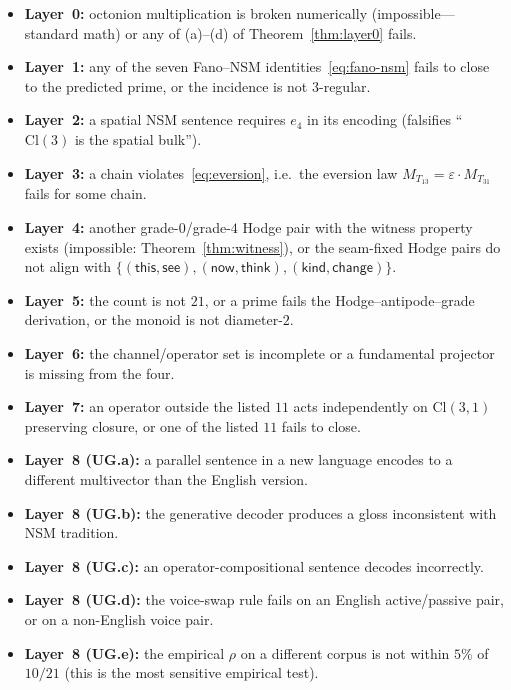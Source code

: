 \documentclass[11pt,a4paper]{article}
\theoremstyle{plain}
\theoremstyle{definition}
\theoremstyle{remark}
\numberwithin{equation}{section}
\providecommand{\Cl}{\mathrm{Cl}}
\providecommand{\eps}{\varepsilon}
\begin{document}
\begin{itemize}
\item \textbf{Layer~0:} octonion multiplication is broken
      numerically (impossible---standard math) or any of (a)--(d)
      of Theorem~\ref{thm:layer0} fails.
\item \textbf{Layer~1:} any of the seven Fano--NSM
      identities~\eqref{eq:fano-nsm} fails to close to the
      predicted prime, or the incidence is not $3$-regular.
\item \textbf{Layer~2:} a spatial NSM sentence requires $e_4$ in
      its encoding (falsifies ``$\Cl(3)$ is the spatial bulk'').
\item \textbf{Layer~3:} a chain violates~\eqref{eq:eversion},
      i.e.\ the eversion law $M_{T_{13}} = \eps \cdot M_{T_{31}}$
      fails for some chain.
\item \textbf{Layer~4:} another grade-$0$/grade-$4$ Hodge pair
      with the witness property exists (impossible:
      Theorem~\ref{thm:witness}), or the seam-fixed Hodge pairs
      do not align with $\{(\mathsf{this}, \mathsf{see}),
      (\mathsf{now}, \mathsf{think}), (\mathsf{kind},
      \mathsf{change})\}$.
\item \textbf{Layer~5:} the count is not $21$, or a prime fails the
      Hodge--antipode--grade derivation, or the monoid is not
      diameter-$2$.
\item \textbf{Layer~6:} the channel/operator set is incomplete or
      a fundamental projector is missing from the four.
\item \textbf{Layer~7:} an operator outside the listed $11$ acts
      independently on $\Cl(3,1)$ preserving closure, or one of
      the listed $11$ fails to close.
\item \textbf{Layer~8 (UG.a):} a parallel sentence in a new
      language encodes to a different multivector than the
      English version.
\item \textbf{Layer~8 (UG.b):} the generative decoder produces a
      gloss inconsistent with NSM tradition.
\item \textbf{Layer~8 (UG.c):} an operator-compositional sentence
      decodes incorrectly.
\item \textbf{Layer~8 (UG.d):} the voice-swap rule fails on an
      English active/passive pair, or on a non-English voice pair.
\item \textbf{Layer~8 (UG.e):} the empirical $\rho$ on a different
      corpus is not within $5\%$ of $10/21$ (this is the most
      sensitive empirical test).
\end{itemize}
\end{document}
